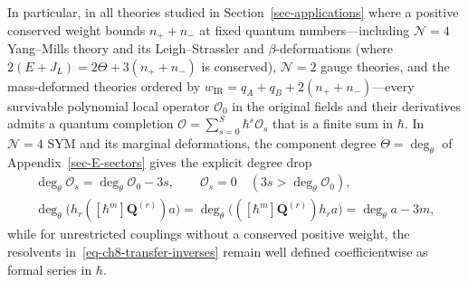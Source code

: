 \documentclass[11pt]{article}
\numberwithin{equation}{section}
\numberwithin{figure}{section}
\numberwithin{table}{section}
\begin{document}
In particular, in all theories studied in Section~\ref{sec-applications} where a positive conserved weight bounds $n_++n_-$ at fixed quantum numbers---including $\mathcal N=4$ Yang--Mills theory and its Leigh--Strassler and $\beta$-deformations (where $2(E+J_L)=2\Theta+3(n_++n_-)$ is conserved), $\mathcal N=2$ gauge theories, and the mass-deformed theories ordered by $w_{\mathrm{IR}}=q_A+q_B+2(n_++n_-)$---every survivable polynomial local operator $\mathcal O_0$ in the original fields and their derivatives admits a quantum completion $\mathcal O=\sum_{s=0}^S\hbar^s\mathcal O_s$ that is a finite sum in $\hbar$. In $\mathcal N=4$ SYM and its marginal deformations, the component degree $\Theta=\deg_\theta$ of Appendix~\ref{sec-E-sectors} gives the explicit degree drop
\begin{equation}\label{local-ch8-finite-correction-degree}
\begin{gathered}
\deg_\theta\mathcal O_s=\deg_\theta\mathcal O_0-3s,
\qquad \mathcal O_s=0\quad(3s>\deg_\theta\mathcal O_0),\\
\deg_\theta\bigl(h_r([\hbar^m]\mathbf Q^{(r)})a\bigr)
=\deg_\theta\bigl(([\hbar^m]\mathbf Q^{(r)})h_ra\bigr)
=\deg_\theta a-3m,
\end{gathered}
\end{equation}
while for unrestricted couplings without a conserved positive weight, the resolvents in~\eqref{eq-ch8-transfer-inverses} remain well defined coefficientwise as formal series in $\hbar$.
\end{document}
